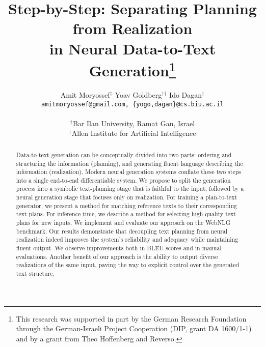\documentclass[11pt,a4paper]{article}
\title{
    Step-by-Step: Separating Planning from Realization \\ 
    in Neural Data-to-Text Generation\thanks{\hspace{0.17cm}This research was supported in part by the German Research Foundation through the German-Israeli Project Cooperation (DIP, grant DA 1600/1-1) and by a grant from Theo Hoffenberg and Reverso.}
}
\author{Amit Moryossef$^\dagger$ \;\; Yoav Goldberg$^\dagger$$^\ddagger$ \;\; Ido Dagan$^\dagger$ \\
\texttt{amitmoryossef@gmail.com, \{yogo,dagan\}@cs.biu.ac.il} \\
\\ $^\dagger$Bar Ilan University, Ramat Gan, Israel \\
$^\ddagger$Allen Institute for Artificial Intelligence
}
\date{}
\begin{document}
\maketitle

\begin{abstract}
Data-to-text generation can be conceptually divided into two parts: ordering and structuring the information (planning), and generating fluent language describing the information (realization). Modern neural generation systems conflate these two steps into a single end-to-end differentiable system. We propose to split the generation process into a symbolic text-planning stage that is faithful to the input, followed by a neural generation stage that focuses only on realization. 
For training a plan-to-text generator, we present a method for matching reference texts to their corresponding text plans. For inference time, we describe a method for selecting high-quality text plans for new inputs. We implement and evaluate our approach on the WebNLG benchmark. Our results demonstrate that decoupling text planning from neural realization indeed improves the system's reliability and adequacy while maintaining fluent output. We observe improvements both in BLEU scores and in manual evaluations. Another benefit of our approach is the ability to output diverse realizations of the same input, paving the way to explicit control over the generated text structure.
\end{abstract}

\thispagestyle{fancy}
\end{document}
